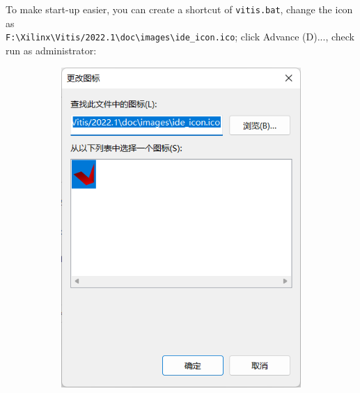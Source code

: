 \documentclass[a4paper,12pt,twoside]{article}
\begin{document}
To make start-up easier, you can create a shortcut of \texttt{vitis.bat}, change the icon as\\ \verb|F:\Xilinx\Vitis/2022.1\doc\images\ide_icon.ico|; click Advance (D)..., check run as administrator:
\begin{figure}[H]
     \centering
     \begin{subfigure}[b]{0.45\textwidth}
         \centering
         \includegraphics[width=\textwidth]{images/12.png}
     \end{subfigure}
     \hfill
     \begin{subfigure}[b]{0.45\textwidth}
         \centering

\end{subfigure}
\end{figure}
\end{document}
